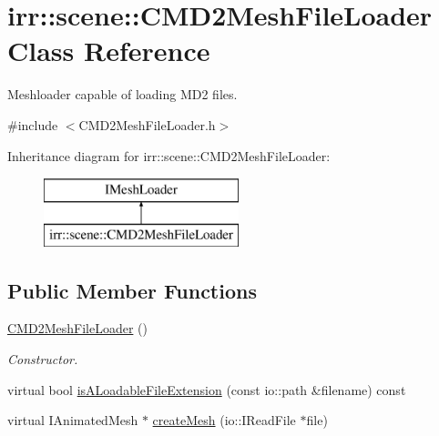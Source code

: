 \hypertarget{classirr_1_1scene_1_1_c_m_d2_mesh_file_loader}{\section{irr\-:\-:scene\-:\-:C\-M\-D2\-Mesh\-File\-Loader Class Reference}
\label{classirr_1_1scene_1_1_c_m_d2_mesh_file_loader}
}


Meshloader capable of loading M\-D2 files.  




{\ttfamily \#include $<$C\-M\-D2\-Mesh\-File\-Loader.\-h$>$}

Inheritance diagram for irr\-:\-:scene\-:\-:C\-M\-D2\-Mesh\-File\-Loader\-:\begin{figure}[H]
\begin{center}
\leavevmode
\includegraphics[height=2.000000cm]{classirr_1_1scene_1_1_c_m_d2_mesh_file_loader}
\end{center}
\end{figure}
\subsection*{Public Member Functions}
\begin{DoxyCompactItemize}
\item 
\hypertarget{classirr_1_1scene_1_1_c_m_d2_mesh_file_loader_a9043eefc4be51f4cdd48d6c11be91d12}{\hyperlink{classirr_1_1scene_1_1_c_m_d2_mesh_file_loader_a9043eefc4be51f4cdd48d6c11be91d12}{C\-M\-D2\-Mesh\-File\-Loader} ()}\label{classirr_1_1scene_1_1_c_m_d2_mesh_file_loader_a9043eefc4be51f4cdd48d6c11be91d12}

\begin{DoxyCompactList}\small\item\em Constructor. \end{DoxyCompactList}\item 
virtual bool \hyperlink{classirr_1_1scene_1_1_c_m_d2_mesh_file_loader_a03af634fec7d9022dee76210118d0667}{is\-A\-Loadable\-File\-Extension} (const io\-::path \&filename) const 
\item 
virtual I\-Animated\-Mesh $\ast$ \hyperlink{classirr_1_1scene_1_1_c_m_d2_mesh_file_loader_ab420912d899aa688ee022a7b1fb30b96}{create\-Mesh} (io\-::\-I\-Read\-File $\ast$file)
\end{DoxyCompactItemize}


